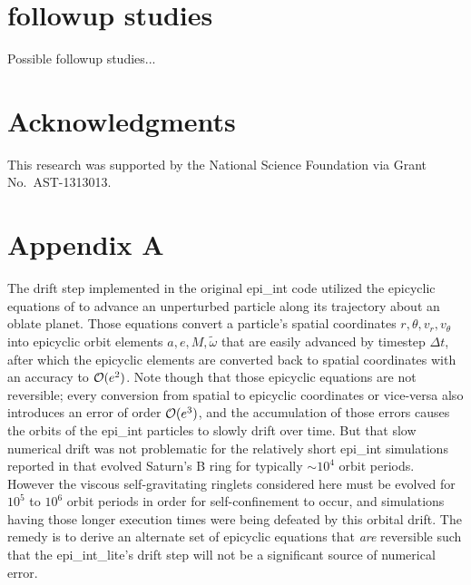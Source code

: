 \documentclass[preprint]{aastex62}
\begin{document}
\section{followup studies}
\label{sec:followup}

Possible followup studies...

\acknowledgments
\section{Acknowledgments}
\label{sec:Acknowledgments}

This research was supported by the National Science Foundation via Grant No.\ AST-1313013.


\appendix

\section{Appendix A}
\label{sec:Appendix A}

The drift step implemented in the original epi\_int code utilized the epicyclic equations of \cite{BL94}
to advance an unperturbed particle along its trajectory about an oblate planet. Those equations
convert a particle's spatial coordinates $r, \theta, v_r, v_\theta$
into epicyclic orbit elements $a,e,M,\tilde{\omega}$ that are easily advanced by timestep
$\Delta t$, after which the epicyclic elements are converted back to spatial coordinates
with an accuracy to ${\cal O}(e^2)$. Note though that those epicyclic equations are not reversible;
every conversion from spatial to epicyclic coordinates or vice-versa also introduces an 
error of order ${\cal O}(e^3)$, and the accumulation of those errors causes the orbits of the epi\_int particles to 
slowly drift over time.  But that slow numerical drift
was not problematic for the relatively short epi\_int simulations reported in \cite{HS13} that evolved
Saturn's B ring for typically $\sim10^4$ orbit periods. However the viscous self-gravitating
ringlets considered here must be evolved for $10^5$ to $10^6$ orbit periods in order for self-confinement to occur,
and simulations having those longer execution times were being defeated by this orbital drift. 
The remedy is to derive an alternate set of epicyclic equations that
{\em are} reversible such that the epi\_int\_lite's drift step will not be a significant
source of numerical error.
\end{document}
